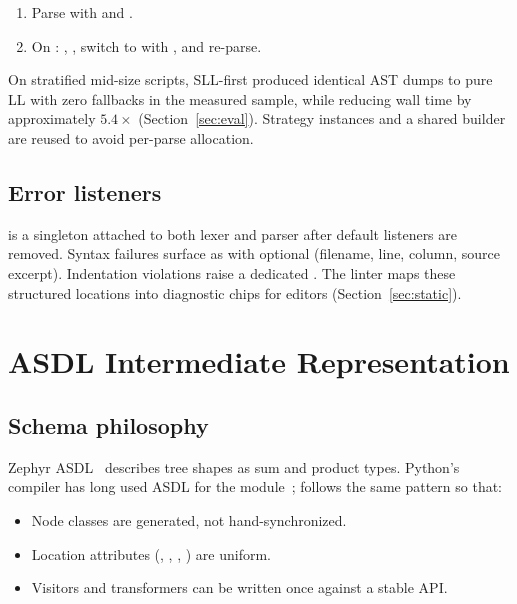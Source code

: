 \documentclass[11pt,a4paper]{article}
\begin{document}
\begin{enumerate}[leftmargin=*]
  \item Parse with  and .
  \item On : ,
    , switch to  with
    , and re-parse.
\end{enumerate}

On stratified mid-size scripts, SLL-first produced identical AST dumps to
pure LL with zero fallbacks in the measured sample, while reducing wall time by
approximately \(5.4\times\) (Section~\ref{sec:eval}). Strategy instances and a
shared builder are reused to avoid per-parse allocation.

\subsection{Error listeners}
\label{sec:errors}

 is a singleton attached to both lexer and
parser after default listeners are removed. Syntax failures surface as
 with optional
 (filename, line, column, source excerpt). Indentation
violations raise a dedicated . The linter maps these
structured locations into diagnostic chips for editors (Section~\ref{sec:static}).

\section{ASDL Intermediate Representation}
\label{sec:asdl}

\subsection{Schema philosophy}
\label{sec:asdl-philosophy}

Zephyr ASDL~\citep{wang1997asdl} describes tree shapes as sum and product types.
Python's compiler has long used ASDL for the  module~\citep{asdl-python};
\pyne{} follows the same pattern so that:

\begin{itemize}[leftmargin=*]
  \item Node classes are generated, not hand-synchronized.
  \item Location attributes (, ,
    , ) are uniform.
  \item Visitors and transformers can be written once against a stable API.
\end{itemize}
\end{document}
